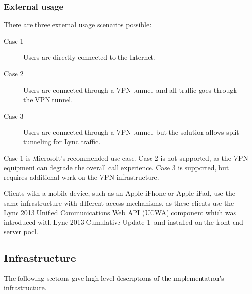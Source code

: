 \subsubsection{External usage}

There are three external usage scenarios possible:
\begin{description}
	\item[Case 1] Users are directly connected to the Internet.
	\item[Case 2] Users are connected through a VPN tunnel, and all traffic goes through the VPN tunnel.
	\item[Case 3] Users are connected through a VPN tunnel, but the solution allows split tunneling for Lync traffic.
\end{description}
Case 1 is Microsoft's recommended use case. Case 2 is not supported, as the VPN equipment can degrade the overall call experience. Case 3 is supported, but requires additional work on the VPN infrastructure.

Clients with a mobile device, such as an Apple iPhone or Apple iPad, use the same infrastructure with different access mechanisms, as these clients use the Lync 2013 Unified Communications Web API (UCWA) component which was introduced with Lync 2013 Cumulative Update 1, and installed on the front end server pool.






\subsection{Infrastructure}
	The following sections give high level descriptions of the implementation's infrastructure.

